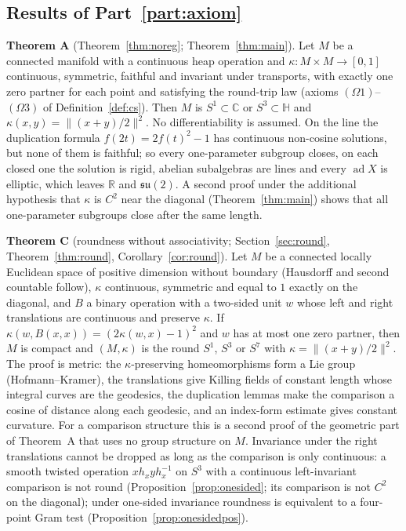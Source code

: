 \documentclass[11pt,reqno]{amsart}
\theoremstyle{definition}
\theoremstyle{remark}
\numberwithin{equation}{section}
\newcommand{\R}{\mathbb{R}}
\newcommand{\C}{\mathbb{C}}
\newcommand{\HH}{\mathbb{H}}
\newcommand{\su}{\mathfrak{su}}
\newcommand{\ad}{\operatorname{ad}}
\begin{document}
\subsection{Results of Part~\ref{part:axiom}}
\noindent\textbf{Theorem A} (Theorem~\ref{thm:noreg}; Theorem~\ref{thm:main}).  Let $M$ be a connected manifold with a
continuous heap operation and $\kappa\colon M\times M\to[0,1]$ continuous, symmetric, faithful and invariant under
transports, with exactly one zero partner for each point and satisfying the round-trip law (axioms $(\Omega1)$--$(\Omega3)$ of
Definition~\ref{def:cs}).  Then $M$ is $S^1\subset\C$ or
$S^3\subset\HH$ and $\kappa(x,y)=\lVert(x+y)/2\rVert^2$.  No differentiability is assumed.  On the line the duplication formula
$f(2t)=2f(t)^2-1$ has continuous non-cosine solutions, but none of them is faithful; so every one-parameter subgroup closes,
on each closed one the solution is rigid, abelian subalgebras are lines and every $\ad X$ is elliptic, which leaves $\R$
and $\su(2)$.  A second proof under the additional hypothesis that $\kappa$ is $C^2$ near the diagonal
(Theorem~\ref{thm:main}) shows that all one-parameter subgroups close after the same length.

\noindent\textbf{Theorem C} (roundness without associativity; Section~\ref{sec:round}, Theorem~\ref{thm:round}, Corollary~\ref{cor:round}).  Let $M$ be a connected
locally Euclidean space of positive dimension without boundary (Hausdorff and second countable follow), $\kappa$ continuous, symmetric and equal to $1$ exactly on the diagonal, and $B$ a binary operation with a
two-sided unit $w$ whose left and right translations are continuous and preserve $\kappa$.  If $\kappa(w,B(x,x))=(2\kappa(w,x)-1)^2$ and $w$
has at most one zero partner, then $M$ is compact and $(M,\kappa)$ is the round $S^1$, $S^3$ or $S^7$ with $\kappa=\lVert(x+y)/2\rVert^2$.  The
proof is metric: the $\kappa$-preserving homeomorphisms form a Lie group (Hofmann--Kramer), the translations give Killing fields of
constant length whose integral curves are the geodesics, the duplication lemmas make the comparison a cosine of distance along each
geodesic, and an index-form estimate gives constant curvature.  For a comparison structure this is a second proof of the geometric
part of Theorem~A that uses no group structure on $M$.  Invariance under the right translations cannot be dropped as long as the
comparison is only continuous: a smooth twisted operation $xh_xyh_x^{-1}$ on $S^3$ with a continuous left-invariant comparison is not round
(Proposition~\ref{prop:onesided}; its comparison is not $C^2$ on the diagonal); under one-sided invariance roundness is equivalent to a
four-point Gram test (Proposition~\ref{prop:onesidedpos}).
\end{document}
